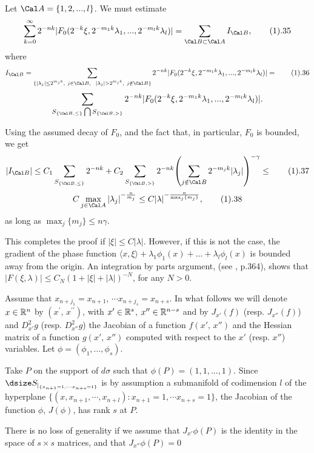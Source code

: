 Let ${\Cal A}=\{1,2,..., l\}$. We must estimate 
$$ \sum_{k=0}^{\infty} 2^{-nk} |F_0(2^{-k}\xi, 2^{-m_1k}{\lambda}_1,..., 
2^{-m_lk}{\lambda}_l)|=\sum_{{\Cal B}\subset {\Cal A}} I_{{\Cal B}}, \tag1.35$$ 
where
$$ I_{{\Cal B}}=\sum_{\{|{\lambda}_j|\leq 2^{m_jk}, \ j\in {\Cal B}, \ \ 
|{\lambda}_j|>2^{m_jk}, \ j\notin {\Cal B}\}} 2^{-nk}
|F_0(2^{-k}\xi, 2^{-m_1k}{\lambda}_1,..., 2^{-m_lk}{\lambda}_l)|= \tag1.36$$
$$\sum_{S_{\{{\Cal B},\leq\}} \bigcap S_{\{{\Cal B}, >\}}}2^{-nk} 
|F_0(2^{-k}\xi, 2^{-m_1k}{\lambda}_1,..., 2^{-m_lk}{\lambda}_l)|.$$ 

Using the assumed decay of $F_0$, and the fact that, in particular, $F_0$ is
bounded, we get 
$$ |I_{{\Cal B}}| \leq C_1\sum_{S_{\{{\Cal B},\leq \}}} 2^{-nk} + 
C_2 \sum_{S_{\{{\Cal B},>\}}} 2^{-nk} {\left( \sum_{j \notin {\Cal B}} 
2^{-m_jk}|{\lambda}_j| \right)}^{-\gamma} \leq \tag1.37$$
$$ C\max_{j \in {\Cal A}} {|{\lambda}_j|}^{-\frac{n}{m_j}} \leq 
C {|\lambda|}^{-\frac{n}{\max_j\{m_j\}}}, \tag1.38$$ as long as 
$\max_j\{m_j\} \leq n\gamma$.

This completes the proof if $|\xi|\leq C|\lambda|$. However, if this is not the
case, the gradient of the phase function $\langle x,\xi \rangle +
{\lambda}_1{\phi}_1(x)+...+ {\lambda}_l{\phi}_l(x)$ is bounded away from the 
origin. An integration by parts argument, (see \cite{St}, p.364), shows that
$|F(\xi,\lambda)| \leq C_N{(1+|\xi|+|\lambda|)}^{-N}$, for any $N>0$. 
\enddemo

 Assume that $x_{n+j_1} = x_{n+1}$, 
$\cdots x_{n+j_s} = x_{n+s}$.
In what follows we will denote  $x\in {\Bbb R}^n$ by 
$(x^{\prime},\,x^{\prime \prime})$, 
with $x^{\prime} \in {\Bbb R}^{s}$, $x^{\prime \prime} \in {\Bbb R}^{n-s}$ and  
by $J_{x'}(f)$ (resp. $J_{x''}(f)$) and $D_{x'}^2g$ 
(resp. $D^2_{x''}g$) the Jacobian 
of a function $f(x',\,x'')$ and the Hessian matrix of a 
function $g(x',\,x'')$ computed with respect to the $x'$ (resp. $x''$) variables. 
Let $\phi=(\phi_1,..., \phi_s)$. 

Take  $P$ on the support of $d\sigma$ such that $\phi(P)=(1,1,...,1).$ 
Since $\dsize S_{\vert_{\{x_{n+1}=1, \cdots x_{n+s}=1\}}}$ is by assumption 
a submanifold of codimension $l$ of the hyperplane 
$\{(x, x_{n+1},\cdots, x_{n+l}) : x_{n+1}=1, \cdots x_{n+s} = 1 \}$,  
the Jacobian of the function 
$\phi$, $J(\phi)$, has rank $s$ at $P$.

There is no loss of generality if we assume  that $J_{x'}\phi(P)$ is the 
identity in the space of $s\times s$ matrices, and that $J_{x''}\phi(P)=0$ 

